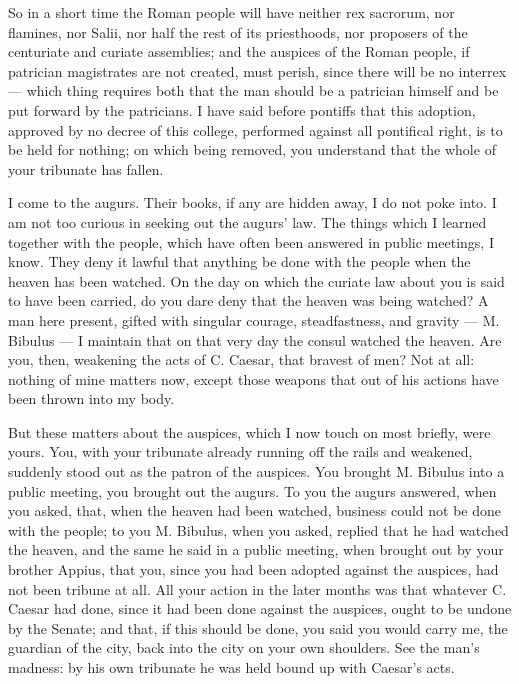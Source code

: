  So in a short time the Roman people will have neither rex sacrorum, nor flamines, nor Salii, nor half the rest of its priesthoods, nor proposers of the centuriate and curiate assemblies; and the auspices of the Roman people, if patrician magistrates are not created, must perish, since there will be no interrex --- which thing requires both that the man should be a patrician himself and be put forward by the patricians. I have said before pontiffs that this adoption, approved by no decree of this college, performed against all pontifical right, is to be held for nothing; on which being removed, you understand that the whole of your tribunate has fallen.

 I come to the augurs. Their books, if any are hidden away, I do not poke into. I am not too curious in seeking out the augurs' law. The things which I learned together with the people, which have often been answered in public meetings, I know. They deny it lawful that anything be done with the people when the heaven has been watched. On the day on which the curiate law about you is said to have been carried, do you dare deny that the heaven was being watched? A man here present, gifted with singular courage, steadfastness, and gravity --- M. Bibulus --- I maintain that on that very day the consul watched the heaven. Are you, then, weakening the acts of C. Caesar, that bravest of men? Not at all: nothing of mine matters now, except those weapons that out of his actions have been thrown into my body.

 But these matters about the auspices, which I now touch on most briefly, were yours. You, with your tribunate already running off the rails and weakened, suddenly stood out as the patron of the auspices. You brought M. Bibulus into a public meeting, you brought out the augurs. To you the augurs answered, when you asked, that, when the heaven had been watched, business could not be done with the people; to you M. Bibulus, when you asked, replied that he had watched the heaven, and the same he said in a public meeting, when brought out by your brother Appius, that you, since you had been adopted against the auspices, had not been tribune at all. All your action in the later months was that whatever C. Caesar had done, since it had been done against the auspices, ought to be undone by the Senate; and that, if this should be done, you said you would carry me, the guardian of the city, back into the city on your own shoulders. See the man's madness: by his own tribunate he was held bound up with Caesar's acts.

